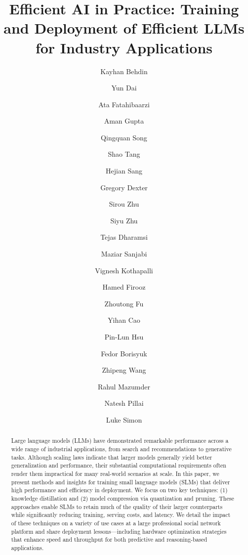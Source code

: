 \documentclass[sigconf,screen,nonacm,review=false,timestamp=false]{acmart}
\begin{document}
\title{Efficient AI in Practice: Training and Deployment of Efficient LLMs for Industry Applications}


\author{Kayhan Behdin}


\author{Yun Dai}
\authornotemark[1]
\author{Ata Fatahibaarzi}
\authornotemark[1]
\author{Aman Gupta}
\authornotemark[1]
\author{Qingquan Song}
\authornotemark[1]




\author{Shao Tang}
\author{Hejian Sang}
\author{Gregory Dexter}
\author{Sirou Zhu}
\author{Siyu Zhu}
\author{Tejas Dharamsi}
\author{Maziar Sanjabi}
\author{Vignesh Kothapalli}
\author{Hamed Firooz}

\author{Zhoutong Fu}
\author{Yihan Cao}
\author{Pin-Lun Hsu}
\author{Fedor Borisyuk}
\author{Zhipeng Wang}
\author{Rahul Mazumder}
\author{Natesh Pillai}
\author{Luke Simon}



\renewcommand{\shortauthors}{Behdin, Dai, Fatahi, Gupta, Song, Tang et al.}
\newcommand{\st}[1]{{\color{orange} #1}}
\begin{abstract}
Large language models (LLMs) have demonstrated remarkable performance across a wide range of industrial applications, from search and recommendations to generative tasks. Although scaling laws indicate that larger models generally yield better generalization and performance, their substantial computational requirements often render them impractical for many real-world scenarios at scale. In this paper, we present methods and insights for training small language models (SLMs) that deliver high performance and efficiency in deployment. We focus on two key techniques: (1) knowledge distillation and (2) model compression via quantization and pruning. These approaches enable SLMs to retain much of the quality of their larger counterparts while significantly reducing training, serving costs, and latency. We detail the impact of these techniques on a variety of use cases at a large professional social network platform and share deployment lessons—including hardware optimization strategies that enhance speed and throughput for both predictive and reasoning-based applications.
\end{abstract}
\end{document}
